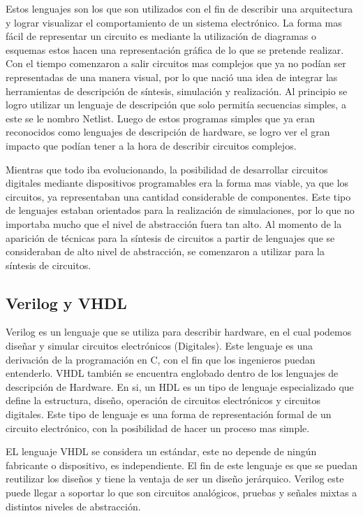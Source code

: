 Estos lenguajes son los que son utilizados con el fin de describir una arquitectura y lograr visualizar el comportamiento de un sistema electrónico. 
La forma mas fácil de representar un circuito es mediante la utilización de diagramas o esquemas estos hacen una representación gráfica de lo que se pretende realizar. 
Con el tiempo comenzaron a salir circuitos mas complejos que ya no podían ser representadas de una manera visual, por lo que nació una idea de integrar las herramientas de descripción de síntesis, simulación y realización. Al principio se logro utilizar un lenguaje de descripción que solo permitía secuencias simples, a este se le nombro Netlist. Luego de estos programas simples que ya eran reconocidos como lenguajes de descripción de hardware, se logro ver el gran impacto que podían tener a la hora de describir circuitos complejos.

Mientras que todo iba evolucionando, la posibilidad de desarrollar circuitos digitales mediante dispositivos programables era la forma mas viable, ya que los circuitos, ya representaban una cantidad considerable de componentes. Este tipo de lenguajes estaban orientados para la realización de simulaciones, por lo que no importaba mucho que el nivel de abstracción fuera tan alto. Al momento de la aparición de técnicas para la síntesis de circuitos a partir de lenguajes que se consideraban de alto nivel de abstracción, se comenzaron a utilizar para la síntesis de circuitos. 
\cite{DDH} 

\subsection*{Verilog y VHDL}

Verilog es un lenguaje que se utiliza para describir hardware, en el cual podemos diseñar y simular circuitos electrónicos (Digitales). Este lenguaje es una derivación de la programación en C, con el fin que los ingenieros puedan entenderlo. 
 VHDL también se encuentra englobado dentro de los lenguajes de descripción de Hardware. En si, un HDL es un tipo de lenguaje especializado que define la estructura, diseño, operación de circuitos electrónicos y circuitos digitales.
 Este tipo de lenguaje es una forma de representación formal de un circuito electrónico, con la posibilidad de hacer un proceso mas simple.
 
 EL lenguaje VHDL se considera un estándar, este no depende de ningún fabricante o dispositivo, es independiente. El fin de este lenguaje es que se puedan reutilizar los diseños y tiene la ventaja de ser un diseño jerárquico.  Verilog este puede llegar a soportar lo que son circuitos analógicos, pruebas y señales mixtas a distintos niveles de abstracción.
 \cite{DDH} 

